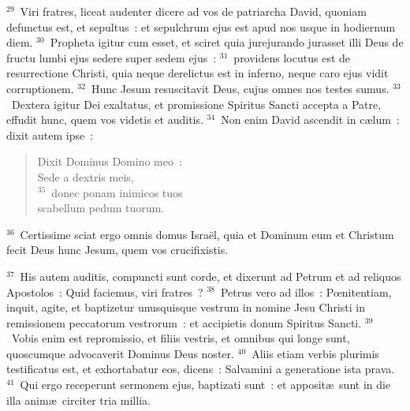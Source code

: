 ${}^{29}$~Viri fratres, liceat audenter dicere ad vos de patriarcha David, quoniam defunctus est, et sepultus~: et sepulchrum ejus est apud nos usque in hodiernum diem.
${}^{30}$~Propheta igitur cum esset, et sciret quia jurejurando jurasset illi Deus de fructu lumbi ejus sedere super sedem ejus~:
${}^{31}$~providens locutus est de resurrectione Christi, quia neque derelictus est in inferno, neque caro ejus vidit corruptionem.
${}^{32}$~Hunc Jesum resuscitavit Deus, cujus omnes nos testes sumus.
${}^{33}$~Dextera igitur Dei exaltatus, et promissione Spiritus Sancti accepta a Patre, effudit hunc, quem vos videtis et auditis.
${}^{34}$~Non enim David ascendit in c\ae lum~: dixit autem ipse~: \begin{flushleft}\begin{verse}Dixit Dominus Domino meo~:\\ Sede a dextris meis,\\
${}^{35}$~donec ponam inimicos tuos\\ scabellum pedum tuorum.\end{verse}\end{flushleft}


${}^{36}$~Certissime sciat ergo omnis domus Isra\"el, quia et Dominum eum et Christum fecit Deus hunc Jesum, quem vos crucifixistis.


${}^{37}$~His autem auditis, compuncti sunt corde, et dixerunt ad Petrum et ad reliquos Apostolos~: Quid faciemus, viri fratres~?
${}^{38}$~Petrus vero ad illos~: Pœnitentiam, inquit, agite, et baptizetur unusquisque vestrum in nomine Jesu Christi in remissionem peccatorum vestrorum~: et accipietis donum Spiritus Sancti.
${}^{39}$~Vobis enim est repromissio, et filiis vestris, et omnibus qui longe sunt, quoscumque advocaverit Dominus Deus noster.
${}^{40}$~Aliis etiam verbis plurimis testificatus est, et exhortabatur eos, dicens~: Salvamini a generatione ista prava.
${}^{41}$~Qui ergo receperunt sermonem ejus, baptizati sunt~: et apposit\ae\ sunt in die illa anim\ae\ circiter tria millia.


